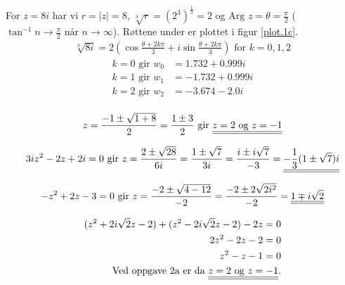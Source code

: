 \documentclass[a4paper,norsk,12pt]{article}
\begin{document}
For $z=8i$ har vi $r = |z| = 8$, $\sqrt[3]{r} = (2^3)^\frac{1}{3} = 2$ og
$\text{Arg }z = \theta = \frac{\pi}{2}$ ($\tan^{-1}{n} \to \frac{\pi}{2} \text{ når } n \to
\infty$). Røttene under er plottet i figur \vref{plot.1c}.
%
\begin{equation*}
\begin{split}
  \sqrt[3]{8i} = 2\left( \cos{\frac{\theta+2k\pi}{3}} +
  i\sin{\frac{\theta+2k\pi}{3}} \right) \text{ for } k = 0, 1, 2
\end{split}
\end{equation*}
%
\begin{equation*}
\begin{split}
  k = 0 \text{ gir } w_0 & = 1.732 + 0.999i \\
  k = 1 \text{ gir } w_1 & = -1.732 + 0.999i \\
  k = 2 \text{ gir } w_2 & = -3.674 - 2.0i \\
\end{split}
\end{equation*}

\begin{equation*}
\begin{split}
  z = \frac{-1 \pm \sqrt{1+8}}{2} = \frac{1\pm 3}{2}
  \text{ gir } {\underline{\underline{z=2 \text{ og } z=-1}}}
\end{split}
\end{equation*}

\begin{equation*}
\begin{split}
  3iz^2 - 2z + 2i = 0 \text{ gir }
  z = \frac{2 \pm \sqrt{28}}{6i}
    = \frac{1 \pm \sqrt{7}}{3i}
    = \frac{i \pm i\sqrt{7}}{-3}
    = \svar{-\frac{1}{3}(1 \pm \sqrt{7})i} \\
\end{split}
\end{equation*}

\begin{equation*}
\begin{split}
  -z^2+2z-3=0 \text{ gir }
   z = \frac{-2 \pm \sqrt{4-12}}{-2}
    = \frac{-2 \pm 2\sqrt{2i^2}}{-2}
    = {\underline{\underline{1 \mp i\sqrt{2}}}}
\end{split}
\end{equation*}

\begin{equation*}
\begin{split}
  (z^2+2i\sqrt{2}z-2) +
  (z^2-2i\sqrt{2}z-2) - 2z = 0 \\
  2z^2 - 2z - 2 = 0 \\
  z^2 - z - 1 = 0 \\
  \text{Ved oppgave 2a er da } {\underline{\underline{z=2 \text{ og } z=-1}}}.
\end{split}
\end{equation*}
\end{document}
